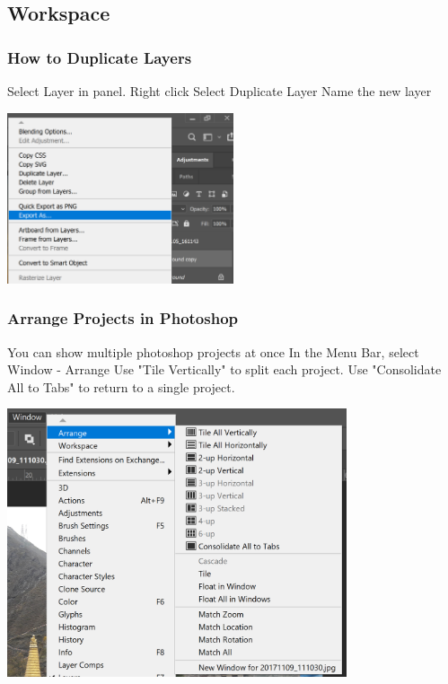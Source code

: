 \documentclass{beamer}
\begin{document}
\subsection{Workspace}
	\begin{frame}
	\frametitle{How to Duplicate Layers}
	\begin{outline}
		\1 Select Layer in panel.
		\1 Right click
		\1 Select Duplicate Layer
		\1 Name the new layer
	\end{outline}
	\begin{center}
		\includegraphics[width = 0.5\textwidth]{images/duplicate.png}
	\end{center}
\end{frame}

	\begin{frame}
	\frametitle{Arrange Projects in Photoshop}
	\begin{outline}
		\1 You can show multiple photoshop projects at once
		\1 In the Menu Bar, select Window - Arrange
		\1 Use "Tile Vertically" to split each project.
		\1 Use "Consolidate All to Tabs" to return to a single project.
	\end{outline}
	\begin{center}
		\includegraphics[width = 0.75\textwidth]{images/arrange.png}
	\end{center}
\end{frame}
\end{document}
